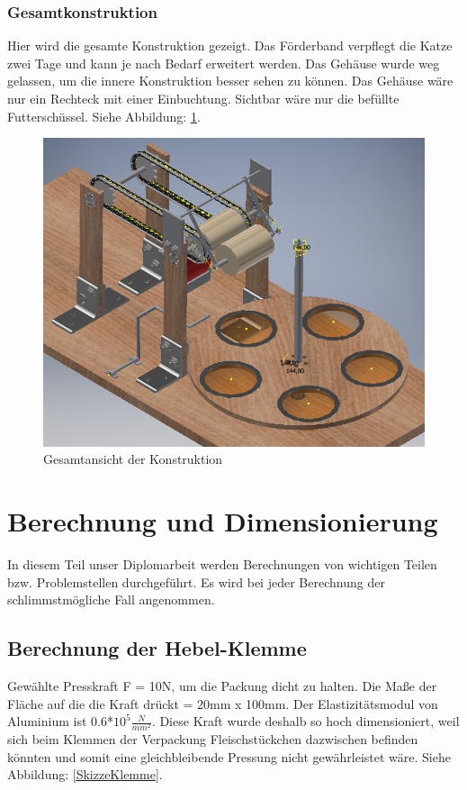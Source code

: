 \subsubsection{Gesamtkonstruktion}

Hier wird die gesamte Konstruktion gezeigt. Das Förderband verpflegt die Katze zwei Tage und kann je nach Bedarf erweitert werden. Das Gehäuse wurde weg gelassen, um die innere Konstruktion besser sehen zu können. Das Gehäuse wäre nur ein Rechteck mit einer Einbuchtung. Sichtbar wäre nur die befüllte Futterschüssel. Siehe Abbildung: \ref{Gesamt_Ansicht_Inventor}.

\begin{figure}[H]
\begin{center}
\includegraphics[width=12cm]{Bilder/Inventor/Gesamt_Ansicht}
\caption{Gesamtansicht der Konstruktion}
\label{Gesamt_Ansicht_Inventor} 
\end{center}
\end{figure}

\section{Berechnung und Dimensionierung}

In diesem Teil unser Diplomarbeit werden Berechnungen von wichtigen Teilen bzw. Problemstellen durchgeführt. Es wird bei jeder Berechnung der schlimmstmögliche Fall angenommen.

\subsection{Berechnung der Hebel-Klemme}
\label{Berechnung_der_Hebel-Klemme}
Gewählte Presskraft F = 10N, um die Packung dicht zu halten. Die Maße der Fläche auf die die Kraft drückt = 20mm x 100mm. Der Elastizitätsmodul von Aluminium ist 0.6*$10^{5}\frac{N}{mm^{2}}$.
Diese Kraft wurde deshalb so hoch dimensioniert, weil sich beim Klemmen der Verpackung Fleischstückchen dazwischen befinden könnten und somit eine gleichbleibende Pressung nicht gewährleistet wäre. Siehe Abbildung: \ref{SkizzeKlemme}.

